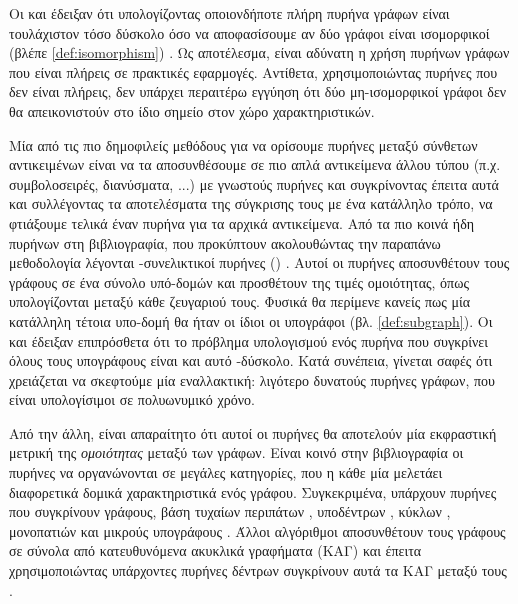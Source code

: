 Οι  και  έδειξαν ότι υπολογίζοντας οποιονδήποτε πλήρη πυρήνα γράφων είναι τουλάχιστον τόσο δύσκολο όσο να αποφασίσουμε αν δύο γράφοι είναι ισομορφικοί (βλέπε \ref{def:isomorphism}) \cite{Gartner03ongraph}.
Ως αποτέλεσμα, είναι αδύνατη η χρήση πυρήνων γράφων που είναι πλήρεις σε πρακτικές εφαρμογές.
Αντίθετα, χρησιμοποιώντας πυρήνες που δεν είναι πλήρεις, δεν υπάρχει περαιτέρω εγγύηση ότι δύο μη-ισομορφικοί γράφοι δεν θα απεικονιστούν στο ίδιο σημείο στον χώρο χαρακτηριστικών.\par
Μία από τις πιο δημοφιλείς μεθόδους για να ορίσουμε πυρήνες μεταξύ σύνθετων αντικειμένων είναι να τα αποσυνθέσουμε σε πιο απλά αντικείμενα άλλου τύπου (π.χ. συμβολοσειρές, διανύσματα, ...) με γνωστούς πυρήνες και συγκρίνοντας έπειτα αυτά και συλλέγοντας τα αποτελέσματα της σύγκρισης τους με ένα κατάλληλο τρόπο, να φτιάξουμε τελικά έναν πυρήνα για τα αρχικά αντικείμενα.
Από τα πιο κοινά ήδη πυρήνων στη βιβλιογραφία, που προκύπτουν ακολουθώντας την παραπάνω μεθοδολογία λέγονται -συνελικτικοί πυρήνες () \cite{Haussler1999ConvolutionKO}.
Αυτοί οι πυρήνες αποσυνθέτουν τους γράφους σε ένα σύνολο υπό-δομών και προσθέτουν της τιμές ομοιότητας, όπως υπολογίζονται μεταξύ κάθε ζευγαριού τους.
Φυσικά θα περίμενε κανείς πως μία κατάλληλη τέτοια υπο-δομή θα ήταν οι ίδιοι οι υπογράφοι (βλ. \ref{def:subgraph}).
Οι  και  έδειξαν επιπρόσθετα ότι το πρόβλημα υπολογισμού ενός πυρήνα που συγκρίνει όλους τους υπογράφους είναι και αυτό -δύσκολο.
Κατά συνέπεια, γίνεται σαφές ότι χρειάζεται να σκεφτούμε μία εναλλακτική: λιγότερο δυνατούς πυρήνες γράφων, που είναι υπολογίσιμοι σε πολυωνυμικό χρόνο.\par
Από την άλλη, είναι απαραίτητο ότι αυτοί οι πυρήνες θα αποτελούν μία εκφραστική μετρική της \textit{ομοιότητας} μεταξύ των γράφων.
Είναι κοινό στην βιβλιογραφία οι πυρήνες να οργανώνονται σε μεγάλες κατηγορίες, που η κάθε μία μελετάει διαφορετικά δομικά χαρακτηριστικά ενός γράφου.
Συγκεκριμένα, υπάρχουν πυρήνες που συγκρίνουν γράφους, βάση τυχαίων περιπάτων \cite{gartner2003graph, borgwardt2005protein, vishwanathan2010graph}, υποδέντρων \cite{Ramon03expressivityversus, Bach2008, Mahe2009}, κύκλων \cite{Horvath2004}, μονοπατιών \cite{Borgwardt2005, Giscard2017} και μικρούς υπογράφους \cite{Costa2010, Hido2009, Kriege2012SubgraphMK, shervashidze2009efficient}.
Άλλοι αλγόριθμοι αποσυνθέτουν τους γράφους σε σύνολα από κατευθυνόμενα ακυκλικά γραφήματα (ΚΑΓ) και έπειτα χρησιμοποιώντας υπάρχοντες πυρήνες δέντρων συγκρίνουν αυτά τα ΚΑΓ μεταξύ τους \cite{Martino2006}.
